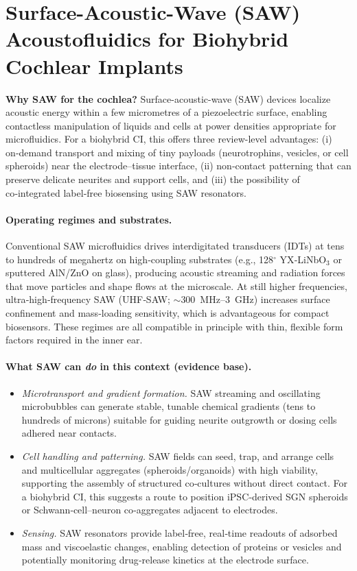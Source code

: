 \section{Surface-Acoustic-Wave (SAW) Acoustofluidics for Biohybrid Cochlear Implants}
\label{sec7}

\noindent\textbf{Why SAW for the cochlea?} Surface-acoustic-wave (SAW) devices localize acoustic energy within a few micrometres of a piezoelectric surface, enabling contactless manipulation of liquids and cells at power densities appropriate for microfluidics.\cite{Ding2013,rufo2022} For a biohybrid CI, this offers three review-level advantages: (i) on‑demand transport and mixing of tiny payloads (neurotrophins, vesicles, or cell spheroids) near the electrode–tissue interface, (ii) non‑contact patterning that can preserve delicate neurites and support cells, and (iii) the possibility of co‑integrated label‑free biosensing using SAW resonators.\cite{Agostini2021_UHFSAW,Mandal2022}

\paragraph{Operating regimes and substrates.} Conventional SAW microfluidics drives interdigitated transducers (IDTs) at tens to hundreds of megahertz on high‑coupling substrates (e.g., 128$^{\circ}$ YX‑LiNbO$_3$ or sputtered AlN/ZnO on glass), producing acoustic streaming and radiation forces that move particles and shape flows at the microscale.\cite{Ding2013,Campbell1998} At still higher frequencies, ultra‑high‑frequency SAW (UHF‑SAW; $\sim$300~MHz–3~GHz) increases surface confinement and mass‑loading sensitivity, which is advantageous for compact biosensors.\cite{Agostini2021_UHFSAW} These regimes are all compatible in principle with thin, flexible form factors required in the inner ear.

\paragraph{What SAW can \emph{do} in this context (evidence base).}
\begin{itemize}
	\item \emph{Microtransport and gradient formation.} SAW streaming and oscillating microbubbles can generate stable, tunable chemical gradients (tens to hundreds of microns) suitable for guiding neurite outgrowth or dosing cells adhered near contacts.\cite{Ahmed2016_LabChip,Ding2013}
	\item \emph{Cell handling and patterning.} SAW fields can seed, trap, and arrange cells and multicellular aggregates (spheroids/organoids) with high viability, supporting the assembly of structured co‑cultures without direct contact.\cite{Li2007,rufo2022} For a biohybrid CI, this suggests a route to position iPSC‑derived SGN spheroids or Schwann‑cell–neuron co‑aggregates adjacent to electrodes.
	\item \emph{Sensing.} SAW resonators provide label‑free, real‑time readouts of adsorbed mass and viscoelastic changes, enabling detection of proteins or vesicles and potentially monitoring drug‑release kinetics at the electrode surface.\cite{Agostini2021_UHFSAW,Mandal2022}
\end{itemize}

